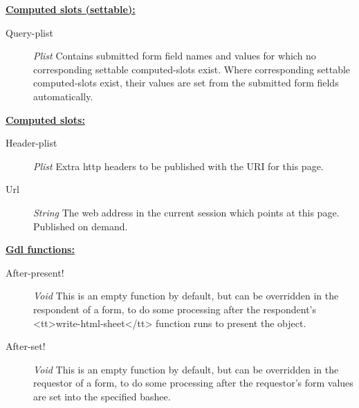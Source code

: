 \documentclass [11pt]{book}
\begin{document}
\begin{itemize}
\begin{description}
\end{description}






\textbf{
\underline{Computed slots (settable):}}

\begin{description}

\item [Query-plist]
\emph{Plist} Contains submitted form field names and values for which no corresponding settable
computed-slots exist. Where corresponding settable computed-slots exist, their values are set from
the submitted form fields automatically.


\end{description}






\textbf{
\underline{Computed slots:}}

\begin{description}

\item [Header-plist]
\emph{Plist} Extra http headers to be published with the URI for this page.


\item [Url]
\emph{String} The web address in the current session which points at this page. Published on demand.


\end{description}






\textbf{
\underline{Gdl functions:}}

\begin{description}

\item [After-present!]
\emph{Void} This is an empty function by default, but can be overridden in
the respondent of a form, to do some processing after the respondent's
<tt>write-html-sheet</tt> function runs to present the object.


\item [After-set!]
\emph{Void} This is an empty function by default, but can be overridden in
the requestor of a form, to do some processing after the requestor's form
values are set into the specified bashee.



\end{description}
\end{itemize}
\end{document}
